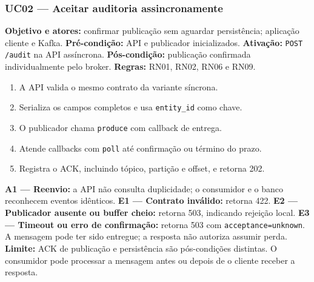 \subsubsection{UC02 --- Aceitar auditoria assincronamente}
\textbf{Objetivo e atores:} confirmar publicação sem aguardar persistência; aplicação cliente e Kafka.
\textbf{Pré-condição:} API e publicador inicializados.
\textbf{Ativação:} \texttt{POST /audit} na API assíncrona.
\textbf{Pós-condição:} publicação confirmada individualmente pelo broker.
\textbf{Regras:} RN01, RN02, RN06 e RN09.
\begin{enumerate}
\item A API valida o mesmo contrato da variante síncrona.
\item Serializa os campos completos e usa \texttt{entity\_id} como chave.
\item O publicador chama \texttt{produce} com callback de entrega.
\item Atende callbacks com \texttt{poll} até confirmação ou término do prazo.
\item Registra o ACK, incluindo tópico, partição e offset, e retorna 202.
\end{enumerate}
\textbf{A1 --- Reenvio:} a API não consulta duplicidade; o consumidor e o banco reconhecem eventos idênticos.
\textbf{E1 --- Contrato inválido:} retorna 422.
\textbf{E2 --- Publicador ausente ou buffer cheio:} retorna 503, indicando rejeição local.
\textbf{E3 --- Timeout ou erro de confirmação:} retorna 503 com \texttt{acceptance=unknown}. A mensagem pode ter sido entregue; a resposta não autoriza assumir perda.
\textbf{Limite:} ACK de publicação e persistência são pós-condições distintas. O consumidor pode processar a mensagem antes ou depois de o cliente receber a resposta.

